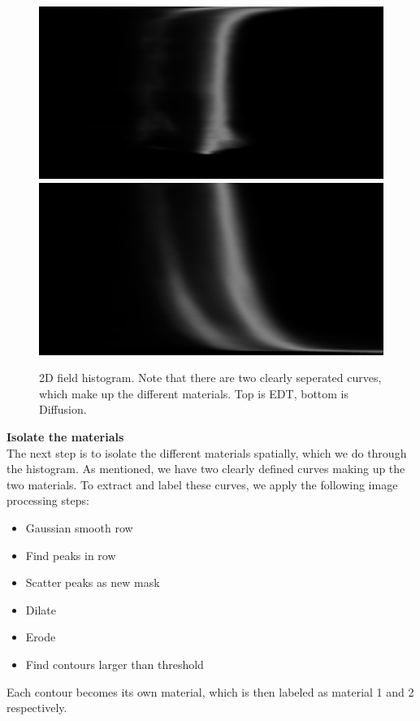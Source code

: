 \begin{figure}
    \includegraphics[width=\linewidth]{figures/fb-edt-bone_region3.png}
    \includegraphics[width=\linewidth]{figures/fb-gauss-bone_region3.png}
    \caption{2D field histogram. Note that there are two clearly seperated curves, which make up the different materials. Top is EDT, bottom is Diffusion.}
    \label{fig:field-hist}
\end{figure}

\vspace{\baselineskip}
\noindent\textbf{Isolate the materials} \\

The next step is to isolate the different materials spatially, which we do through the histogram.
As mentioned, we have two clearly defined curves making up the two materials.
To extract and label these curves, we apply the following image processing steps:
\begin{itemize}
    \item Gaussian smooth row
    \item Find peaks in row
    \item Scatter peaks as new mask
    \item Dilate
    \item Erode
    \item Find contours larger than threshold
\end{itemize}
Each contour becomes its own material, which is then labeled as material 1 and 2 respectively.

